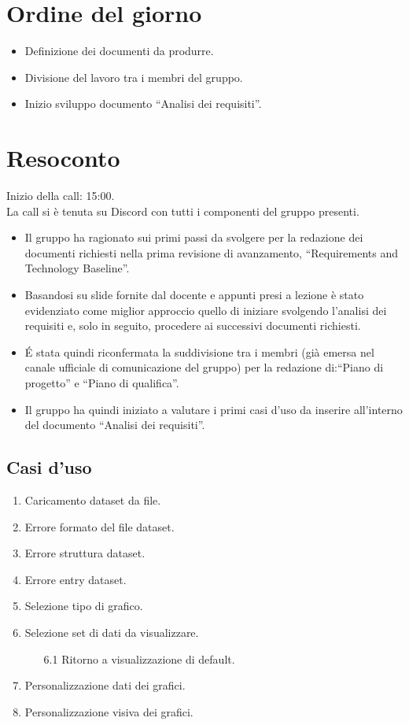 \section{Ordine del giorno}

\begin{itemize}
	\item Definizione dei documenti da produrre.
	\item Divisione del lavoro tra i membri del gruppo.
	\item Inizio sviluppo documento ``Analisi dei requisiti''.
\end{itemize}

\section{Resoconto}

\noindent 
Inizio della call: 15:00. \\
\noindent La call si è tenuta su Discord con tutti i componenti del gruppo presenti.
\begin{itemize}
	\item Il gruppo ha ragionato sui primi passi da svolgere per la redazione dei documenti richiesti nella prima revisione di avanzamento, ``Requirements and Technology Baseline''.
	\item Basandosi su slide fornite dal docente e appunti presi a lezione è stato evidenziato come miglior approccio quello di iniziare svolgendo l'analisi dei requisiti e, solo in seguito, procedere ai successivi documenti richiesti.
	\item \' E stata quindi riconfermata la suddivisione tra i membri (già emersa nel canale ufficiale di comunicazione del gruppo) per la redazione di:``Piano di progetto'' e ``Piano di qualifica''.
	\item Il gruppo ha quindi iniziato a valutare i primi casi d'uso da inserire all'interno del documento ``Analisi dei requisiti''.
\end{itemize}

\subsection{Casi d'uso}
\begin{enumerate}
	\item Caricamento dataset da file.
	\item Errore formato del file dataset.
	\item Errore struttura dataset.
	\item Errore entry dataset.
	\item Selezione tipo di grafico.
	\item Selezione set di dati da visualizzare.
	\begin{enumerate}
		\item[6.1] Ritorno a visualizzazione di default.
	\end{enumerate}
	\item Personalizzazione dati dei grafici.
	\item Personalizzazione visiva dei grafici.
\end{enumerate} 

